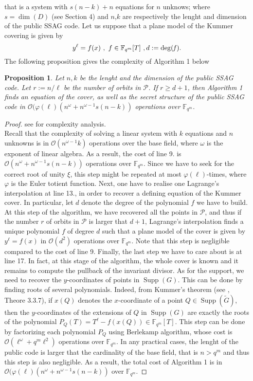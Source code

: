\documentclass[10pt]{article}
\newtheorem{prop1}[thm]{Proposition}
\newcommand{\s}{\vspace{0.3cm}}
\newcommand{\calO}{\mathcal{O}}
\newcommand{\fqm}{\mathbb{F}_{q^m}}
\newcommand{\w}{\omega}
\newcommand{\PR}{\mathcal{P}}
\newcommand{\Supp}{\operatorname{Supp}}
\begin{document}
that is a system with $s(n-k)+n$ equations for $n$ unknows; where $s=\dim(D)$ (see Section 4) and $n$,$k$ are respectively the lenght and dimension of the public SSAG code. Let us suppose that a plane model of the Kummer covering is given by 
\[y^{\ell} = f(x) \ , \ f \in \fqm[T] \ , d:=\deg(\it f).\]
The following proposition gives the complexity of Algorithm 1 below

\s

\begin{prop1} Let $n,k$ be the lenght and the dimension of the public \rm{SSAG} \it code. Let $r := n/\ell$ be the number of orbits in $\PR$. If $r \geq d+1$, then Algorithm 1 finds an equation of the cover, as well as the secret structure of the public \rm SSAG \it code in $\calO(\varphi(\ell)(n^{\w}+n^{\w-1}s(n-k))$ operations over $\fqm$. 

\end{prop1}

\s

\begin{proof} see \cite{CF} for complexity analysis. \\
Recall that the complexity of solving a linear system with $k$ equations and $n$ unknowns is in $\calO(n^{\w-1}k)$ operations over the base field, where $\w$ is the exponent of linear algebra. As a result, the cost of line 9. is $\calO(n^{\w}+n^{\w-1}s(n-k))$ operations over $\fqm$. Since we have to seek for the correct root of unity $\xi$, this step might be repeated at most $\varphi(\ell)$-times, where $\varphi$ is the Euler totient function. Next, one have to realise one Lagrange's interpolation at line 13., in order to recover a defining equation of the Kummer cover. In particular, let $d$ denote the degree of the polynomial $f$ we have to build. At this step of the algorithm, we have recovered all the points in $\PR$, and thus if the number $r$ of orbits in $\PR$ is larger that $d+1$, Lagrange's interpolation finds a unique polynomial $f$ of degree $d$ such that a plane model of the cover is given by $y^{\ell}=f(x)$ in $\calO(d^2)$ operations over $\fqm$. Note that this step is negligible compared to the cost of line 9. Finally, the last step we have to care about is at line 17. In fact, at this stage of the algorithm, the whole cover is known and it remains to compute the pullback of the invariant divisor. As for the support, we need to recover the $y$-coordinates of points in $\Supp(G)$. This can be done by finding roots of several polynomials. Indeed, from Kummer's theorem (see \cite{Sti}, Theore 3.3.7), if $x(Q)$ denotes the $x$-coordinate of a point $Q \in \Supp(\tilde{G})$, then the $y$-coordinates of the extensions of $Q$ in $\Supp(G)$ are exactly the roots of the polynomial $P_Q(T)=T^{\ell}-f(x(Q)) \in \fqm[T]$. This step can be done by factorizing each polynomial $P_Q$ using Berlekamp algorithm, whose cost is $\calO(\ell^{\w}+q^m\ell^{2})$ operations over $\fqm$. In any practical cases, the lenght of the public code is larger that the cardinality of the base field, that is $n > q^m$ and thus this step is also negligible. As a result, the total cost of Algorithm 1 is in $\calO(\varphi(\ell)(n^{\w}+n^{\w-1}s(n-k))$ over $\fqm$.
\end{proof}
\end{document}
